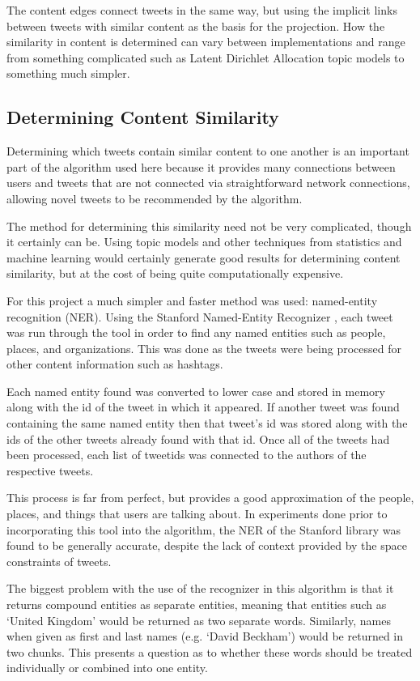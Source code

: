 The content edges connect tweets in the same way, but using the implicit links between tweets with similar content as the basis for the projection. How the similarity in content is determined can vary between implementations and range from something complicated such as Latent Dirichlet Allocation topic models to something much simpler.

\subsection{Determining Content Similarity}
\label{sec:DeterminingContentSimilarity}

Determining which tweets contain similar content to one another is an important part of the algorithm used here because it provides many connections between users and tweets that are not connected via straightforward network connections, allowing novel tweets to be recommended by the algorithm.

The method for determining this similarity need not be very complicated, though it certainly can be. Using topic models and other techniques from statistics and machine learning would certainly generate good results for determining content similarity, but at the cost of being quite computationally expensive.

For this project a much simpler and faster method was used: named-entity recognition (NER). Using the Stanford Named-Entity Recognizer \cite{StanfordNER2011}, each tweet was run through the tool in order to find any named entities such as people, places, and organizations. This was done as the tweets were being processed for other content information such as hashtags.

Each named entity found was converted to lower case and stored in memory along with the id of the tweet in which it appeared. If another tweet was found containing the same named entity then that tweet's id was stored along with the ids of the other tweets already found with that id. Once all of the tweets had been processed, each list of tweetids was connected to the authors of the respective tweets.

This process is far from perfect, but provides a good approximation of the people, places, and things that users are talking about. In experiments done prior to incorporating this tool into the algorithm, the NER of the Stanford library was found to be generally accurate, despite the lack of context provided by the space constraints of tweets.

The biggest problem with the use of the recognizer in this algorithm is that it returns compound entities as separate entities, meaning that entities such as `United Kingdom' would be returned as two separate words. Similarly, names when given as first and last names (e.g. `David Beckham') would be returned in two chunks. This presents a question as to whether these words should be treated individually or combined into one entity.

